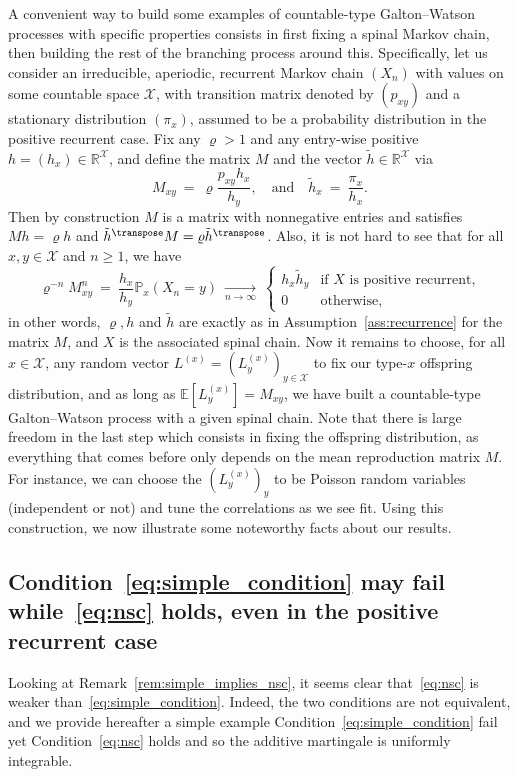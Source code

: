 \begin{refsegment}
A convenient way to build some examples of countable-type Galton--Watson processes with specific properties consists in first fixing a spinal Markov chain, then building the rest of the branching process around this.
Specifically, let us consider an irreducible, aperiodic, recurrent Markov chain $(X_n)$ with values on some countable space $\mathcal{X}$, with transition matrix denoted by $(p_{xy})$ and a stationary distribution $(\pi_x)$, assumed to be a probability distribution in the positive recurrent case.
Fix any $\varrho>1$ and any entry-wise positive $h=(h_x) \in \mathbb{R}^{\mathcal{X}}$, and define the matrix $M$ and the vector $\tilde{h}\in \mathbb{R}^{\mathcal{X}}$ via
\begin{equation}\label{eq:construction_ex}
  M_{xy}\ =\ \varrho\frac{p_{xy}h_x}{h_y},\quad \text{and}\quad \tilde{h}_x\ =\ \frac{\pi_x}{h_x}.
\end{equation}
Then by construction $M$ is a matrix with nonnegative entries and satisfies $Mh=\varrho h$ and $\tilde{h}^\transpose M=\varrho \tilde{h}^\transpose$.
Also, it is not hard to see that for all $x,y\in \mathcal{X}$ and $n\geq 1$, we have
\[
  \varrho^{-n}M^n_{xy}\ =\ \frac{h_x}{h_y}\mathbb{P}_x(X_n=y)\ \underset{n\to \infty}{\longrightarrow}\  \begin{cases}
    h_x\tilde{h}_y & \text{if }X\text{ is positive recurrent,}\\
    0 & \text{otherwise,}
  \end{cases}
\]
in other words, $\varrho, h$ and $\tilde{h}$ are exactly as in Assumption~\ref{ass:recurrence} for the matrix $M$, and $X$ is the associated spinal chain.
Now it remains to choose, for all $x\in \mathcal{X}$, any random vector $L^{(x)}=(L^{(x)}_y)_{y\in \mathcal{X}}$ to fix our type-$x$ offspring distribution, and as long as $\mathbb{E}[L^{(x)}_y]=M_{xy}$, we have built a countable-type Galton--Watson process with a given spinal chain.
Note that there is large freedom in the last step which consists in
fixing the offspring distribution, as everything that comes before
only depends on the mean reproduction matrix $M$. For instance,
  we can choose the $(L^{(x)}_y)_y$ to be Poisson random variables
  (independent or not) and tune the correlations as we see fit.
Using this construction, we now illustrate some noteworthy facts about our results.

\subsection*{Condition~\eqref{eq:simple_condition} may fail while~\eqref{eq:nsc} holds, even in the positive recurrent case}
Looking at Remark~\ref{rem:simple_implies_nsc}, it seems clear that~\eqref{eq:nsc} is weaker than~\eqref{eq:simple_condition}. Indeed, the two conditions are not equivalent, and we provide hereafter a simple example Condition~\eqref{eq:simple_condition} fail yet Condition~\eqref{eq:nsc} holds and so the additive martingale is uniformly integrable.


\end{refsegment}
